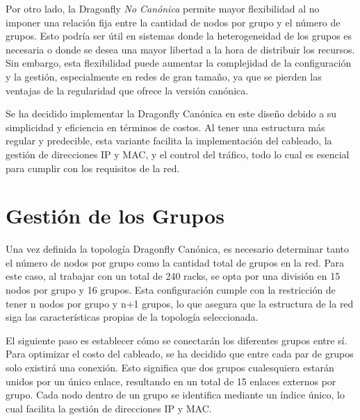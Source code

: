 \documentclass[%
    school=etsisi,%
    degree=61TI,%
]{upm-report}
\begin{document}
Por otro lado, la Dragonfly \textit{No Canónica} permite mayor flexibilidad al no imponer una relación fija entre la cantidad de nodos por grupo y el número de grupos. Esto podría ser útil en sistemas donde la heterogeneidad de los grupos es necesaria o donde se desea una mayor libertad a la hora de distribuir los recursos. Sin embargo, esta flexibilidad puede aumentar la complejidad de la configuración y la gestión, especialmente en redes de gran tamaño, ya que se pierden las ventajas de la regularidad que ofrece la versión canónica.

Se ha decidido implementar la Dragonfly Canónica en este diseño debido a su simplicidad y eficiencia en términos de costos. Al tener una estructura más regular y predecible, esta variante facilita la implementación del cableado, la gestión de direcciones IP y MAC, y el control del tráfico, todo lo cual es esencial para cumplir con los requisitos de la red.

\section{Gestión de los Grupos}
\label{sec:gestion-grupos}

Una vez definida la topología Dragonfly Canónica, es necesario determinar tanto el número de nodos por grupo como la cantidad total de grupos en la red. Para este caso, al trabajar con un total de 240 racks, se opta por una división en 15 nodos por grupo y 16 grupos. Esta configuración cumple con la restricción de tener n nodos por grupo y n+1 grupos, lo que asegura que la estructura de la red siga las características propias de la topología seleccionada.

El siguiente paso es establecer cómo se conectarán los diferentes grupos entre sí. Para optimizar el costo del cableado, se ha decidido que entre cada par de grupos solo existirá una conexión. Esto significa que dos grupos cualesquiera estarán unidos por un único enlace, resultando en un total de 15 enlaces externos por grupo. Cada nodo dentro de un grupo se identifica mediante un índice único, lo cual facilita la gestión de direcciones IP y MAC.
\end{document}
